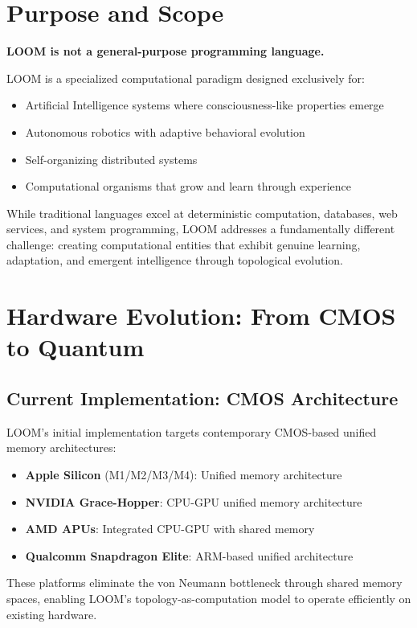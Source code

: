 \documentclass[12pt,a4paper,openany]{book} %
\begin{document}
\section{Purpose and Scope}

\textbf{LOOM is not a general-purpose programming language.}

LOOM is a specialized computational paradigm designed exclusively for:
\begin{itemize}
\item Artificial Intelligence systems where consciousness-like properties emerge
\item Autonomous robotics with adaptive behavioral evolution
\item Self-organizing distributed systems
\item Computational organisms that grow and learn through experience
\end{itemize}

While traditional languages excel at deterministic computation, databases, web services, and system programming, LOOM addresses a fundamentally different challenge: creating computational entities that exhibit genuine learning, adaptation, and emergent intelligence through topological evolution.

\section{Hardware Evolution: From CMOS to Quantum}

\subsection{Current Implementation: CMOS Architecture}

LOOM's initial implementation targets contemporary CMOS-based unified memory architectures:
\begin{itemize}
\item \textbf{Apple Silicon} (M1/M2/M3/M4): Unified memory architecture
\item \textbf{NVIDIA Grace-Hopper}: CPU-GPU unified memory architecture
\item \textbf{AMD APUs}: Integrated CPU-GPU with shared memory
\item \textbf{Qualcomm Snapdragon Elite}: ARM-based unified architecture
\end{itemize}

These platforms eliminate the von Neumann bottleneck through shared memory spaces, enabling LOOM's topology-as-computation model to operate efficiently on existing hardware.
\end{document}
